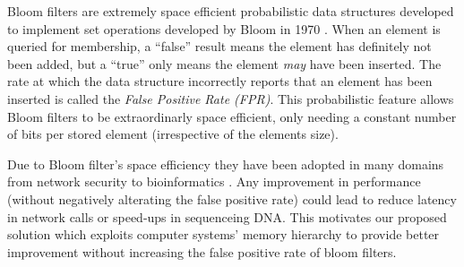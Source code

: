 Bloom filters are extremely space efficient probabilistic data structures developed to implement set operations developed by Bloom in 1970 \cite{Bloom}.
When an element is queried for membership, a ``false'' result means 
the element has definitely not been added, but a ``true'' only means
the element \textit{may} have been inserted. 
The rate at which the data structure incorrectly reports that an element has been inserted is called the \textit{False Positive Rate (FPR)}.
This probabilistic feature allows Bloom filters to be extraordinarly space efficient,
only needing a constant number of bits per stored element (irrespective of the elements size).

Due to Bloom filter's space efficiency they have been adopted in many domains from network security \cite{GERAVAND20134047} to bioinformatics \cite{btu558}.
Any improvement in performance (without negatively alterating the false positive rate) could lead to reduce latency in network calls or speed-ups in sequenceing DNA.
This motivates our proposed solution which exploits computer systems' memory hierarchy to provide better improvement without increasing the false positive rate of bloom filters.